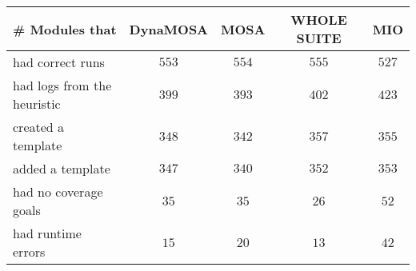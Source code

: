 
\begin{tabular}{lcccc}\toprule
    \multicolumn{1}{c}{\# Modules that}    & DynaMOSA   & MOSA      & WHOLE SUITE   & MIO     \\ \midrule
    had correct runs                               & \(553\)  & \(554\) & \(555\)     & \(527\) \\
    had logs from the heuristic                    & \(399\)  & \(393\) & \(402\)     & \(423\) \\
    created a template                             & \(348\)  & \(342\) & \(357\)    & \(355\) \\ 
    added a template                               & \(347\)  & \(340\) & \(352\)    & \(353\) \\ 
    had no coverage goals                          & \(35\)  & \(35\) & \(26\)    & \(52\) \\ 
    had runtime errors                             & \(15\)  & \(20\) & \(13\)    & \(42\) \\ 
    \bottomrule
  \end{tabular}
